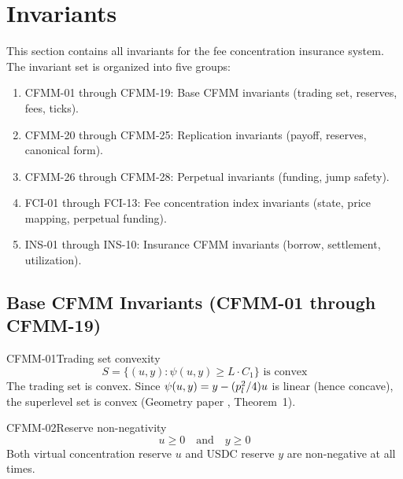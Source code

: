 
\section{Invariants}\label{sec:invariants}

This section contains all invariants for the fee concentration insurance system.
The invariant set is organized into five groups:
\begin{enumerate}
  \item CFMM-01 through CFMM-19: Base CFMM invariants (trading set, reserves, fees, ticks).
  \item CFMM-20 through CFMM-25: Replication invariants (payoff, reserves, canonical form).
  \item CFMM-26 through CFMM-28: Perpetual invariants (funding, jump safety).
  \item FCI-01 through FCI-13: Fee concentration index invariants (state, price mapping, perpetual funding).
  \item INS-01 through INS-10: Insurance CFMM invariants (borrow, settlement, utilization).
\end{enumerate}

\subsection{Base CFMM Invariants (CFMM-01 through CFMM-19)}\label{sec:base-cfmm}

\begin{invariant}{CFMM-01}{Trading set convexity}
\[
  S = \{(u, y) : \psi(u, y) \geq L \cdot C_1\} \text{ is convex}
\]
The trading set is convex. Since $\psi(u,y) = y - (p_l^2/4)u$ is linear (hence concave),
the superlevel set is convex (Geometry paper \cite{angeris2023geometry}, Theorem~1).
\end{invariant}

\begin{invariant}{CFMM-02}{Reserve non-negativity}
\[
  u \geq 0 \quad\text{and}\quad y \geq 0
\]
Both virtual concentration reserve $u$ and USDC reserve $y$ are non-negative at all times.
\end{invariant}

